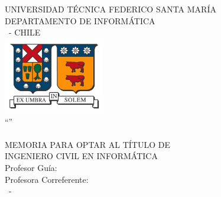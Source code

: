 \begin{titlepage}
  \begin{center}
    \noindent
    {\fontsize{18}{22}\selectfont UNIVERSIDAD TÉCNICA FEDERICO SANTA MARÍA \\}
    {\fontsize{16}{19}\selectfont DEPARTAMENTO DE INFORMÁTICA \\}
    {\fontsize{16}{19}\selectfont \MakeUppercase{\ciudad}\ - CHILE \\}
    \vspace{1.5cm}
    \includegraphics[width=4.41cm,height=3.34cm]{logo/logo.jpg} \\
    \vspace{1.5cm}
    {\fontsize{20}{24}\selectfont ``\MakeUppercase{\titulo}'' \\}
    \vfill
    {\fontsize{16}{19}\selectfont \MakeUppercase{\nombrealumno} \\}
    \vfill
    {\fontsize{16}{19}\selectfont MEMORIA PARA OPTAR AL TÍTULO DE \\}
    {\fontsize{16}{19}\selectfont INGENIERO CIVIL EN INFORMÁTICA \\}
    \vspace{1.5cm}
    {\fontsize{14}{17}\selectfont Profesor Guía: \nombreprofesor \\}
    {\fontsize{14}{17}\selectfont Profesora Correferente: \nombrecorreferente \\}
    \vspace{2.5cm}
    {\fontsize{14}{17}\selectfont \mesexamen\ - \anioexamen \\}
  \end{center}
\end{titlepage}

